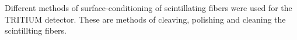 Different methods of surface-conditioning of scintillating fibers were used for the TRITIUM detector. These are methods of cleaving, polishing and cleaning the scintillting fibers.